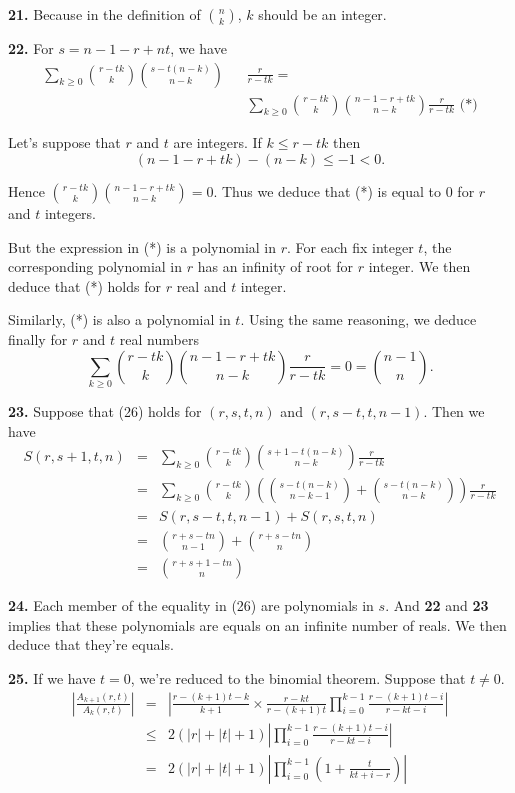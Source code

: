 \documentclass[a4paper,12pt]{article}
\newcommand{\newpar}[1]{\bigskip \noindent \textbf{#1.}}
\begin{document}
\newpar{21} Because in the definition of ${n \choose k}$, $k$ should be an
integer.

\newpar{22} For $s = n-1-r+nt$, we have
\begin{eqnarray*}
  \sum_{k\ge 0} {{r-tk} \choose k} {{s-t(n-k)} \choose {n-k}} &&
  \frac{r}{r-tk} = \\ &&\sum_{k\ge 0} {{r-tk} \choose k}
       {{n-1-r+tk} \choose {n-k}} \frac{r}{r-tk} \mbox{ (*)}
\end{eqnarray*}

Let's suppose that $r$ and $t$ are integers. If $k \le r - tk$ then
\[ (n-1-r+tk) - (n-k) \le -1 < 0.\]

Hence ${{r-tk} \choose k} {{n-1-r+tk} \choose {n-k}} = 0$.  Thus we deduce that (*) is
equal to $0$ for $r$ and $t$ integers.

But the expression in (*) is a polynomial in $r$.  For each fix integer
$t$, the corresponding polynomial in $r$ has an infinity of root for
$r$ integer.  We then deduce that (*) holds for $r$ real and $t$
integer.

Similarly, (*) is also a polynomial in $t$.  Using the same reasoning,
we deduce finally for $r$ and $t$ real numbers
\[\sum_{k\ge 0} {{r-tk} \choose k} {{n-1-r+tk} \choose {n-k}}
\frac{r}{r-tk} = 0 = {{n-1} \choose n}.\]

\newpar{23}  Suppose that (26) holds for $(r,s,t,n)$ and
$(r,s-t,t,n-1)$.  Then we have
\begin{eqnarray*}
  S(r,s+1,t,n) &=& \sum_{k\ge 0} {{r-tk} \choose k} {{s+1-t(n-k)}
    \choose {n-k}}
  \frac{r}{r-tk}\\
  &=& \sum_{k\ge 0} {{r-tk} \choose k} \left( {{s-t(n-k)} \choose {n-k-1}} +
  {{s-t(n-k)} \choose {n-k}}\right) \frac{r}{r-tk} \\
  &=& S(r,s-t,t,n-1) + S(r,s,t,n) \\
  &=& {{r+s-tn} \choose {n-1}} + {{r+s-tn} \choose n} \\
  &=& {{r+s+1-tn} \choose n}
\end{eqnarray*}

\newpar{24} Each member of the equality in (26) are polynomials in
$s$.  And \textbf{22} and \textbf{23} implies that these polynomials
are equals on an infinite number of reals.  We then deduce that
they're equals.

\newpar{25} If we have $t=0$, we're reduced to the binomial theorem.
Suppose that $t \not= 0$.
\begin{eqnarray*}
  \left| \frac{A_{k+1}(r,t)}{A_k(r,t)} \right| &=&
  \left| \frac{r-(k+1)t - k}{k+1}\times \frac{r-kt}{r-(k+1)t} \prod_{i=0}^{k-1}
  \frac{r - (k+1)t - i}{r - kt - i}\right| \\
  &\le& 2(|r|+|t|+1) \left| \prod_{i=0}^{k-1} \frac{r - (k+1)t - i}{r - kt
    - i}\right| \\
  &=& 2(|r|+|t|+1) \left| \prod_{i=0}^{k-1}\left( 1 +
  \frac{t}{kt+i-r}\right)\right|
\end{eqnarray*}
\end{document}

